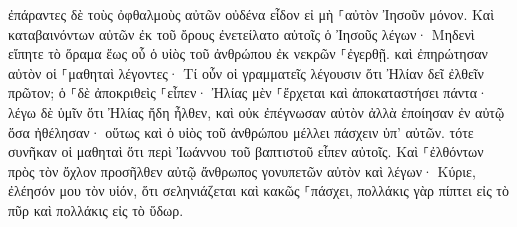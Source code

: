 \documentclass{openreader}
\begin{document}
ἐπάραντες δὲ τοὺς ὀφθαλμοὺς αὐτῶν οὐδένα εἶδον εἰ μὴ ⸀αὐτὸν Ἰησοῦν μόνον. 
Καὶ καταβαινόντων αὐτῶν ἐκ τοῦ ὄρους ἐνετείλατο αὐτοῖς ὁ Ἰησοῦς λέγων· Μηδενὶ εἴπητε τὸ ὅραμα ἕως οὗ ὁ υἱὸς τοῦ ἀνθρώπου ἐκ νεκρῶν ⸀ἐγερθῇ. 
καὶ ἐπηρώτησαν αὐτὸν οἱ ⸀μαθηταὶ λέγοντες· Τί οὖν οἱ γραμματεῖς λέγουσιν ὅτι Ἠλίαν δεῖ ἐλθεῖν πρῶτον; 
ὁ ⸀δὲ ἀποκριθεὶς ⸀εἶπεν· Ἠλίας μὲν ⸀ἔρχεται καὶ ἀποκαταστήσει πάντα· 
λέγω δὲ ὑμῖν ὅτι Ἠλίας ἤδη ἦλθεν, καὶ οὐκ ἐπέγνωσαν αὐτὸν ἀλλὰ ἐποίησαν ἐν αὐτῷ ὅσα ἠθέλησαν· οὕτως καὶ ὁ υἱὸς τοῦ ἀνθρώπου μέλλει πάσχειν ὑπ’ αὐτῶν. 
τότε συνῆκαν οἱ μαθηταὶ ὅτι περὶ Ἰωάννου τοῦ βαπτιστοῦ εἶπεν αὐτοῖς. 
Καὶ ⸀ἐλθόντων πρὸς τὸν ὄχλον προσῆλθεν αὐτῷ ἄνθρωπος γονυπετῶν αὐτὸν 
καὶ λέγων· Κύριε, ἐλέησόν μου τὸν υἱόν, ὅτι σεληνιάζεται καὶ κακῶς ⸀πάσχει, πολλάκις γὰρ πίπτει εἰς τὸ πῦρ καὶ πολλάκις εἰς τὸ ὕδωρ. 
\end{document}
